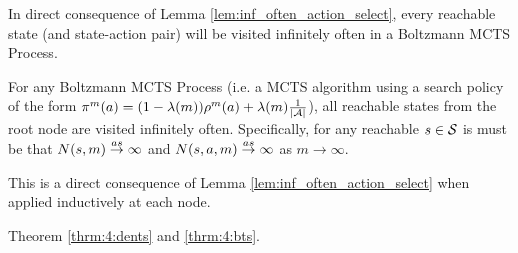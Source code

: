         
    
    
    
    
    
    
    
        In direct consequence of Lemma \ref{lem:inf_often_action_select}, every reachable state (and state-action pair) will be visited infinitely often in a Boltzmann MCTS Process.
    
        \begin{corollary} \label{cor:inf_often_visit_node}
            For any Boltzmann MCTS Process (i.e. a MCTS algorithm using a search policy of the form $\pi^m(a)=(1-\lambda(m))\rho^m(a) + \lambda(m) \frac{1}{|\mathcal{A}|}$), all reachable states from the root node are visited infinitely often. Specifically, for any reachable $s\in\mathcal{S}$ is must be that $N(s,m)\overset{as}{\to}\infty$ and $N(s,a,m)\overset{as}{\to}\infty$ as $m\rightarrow\infty$. 
        \end{corollary}
        \begin{proofoutline}
            This is a direct consequence of Lemma \ref{lem:inf_often_action_select} when applied inductively at each node.
        \end{proofoutline}















        Theorem \ref{thrm:4:dents} and \ref{thrm:4:bts}.























